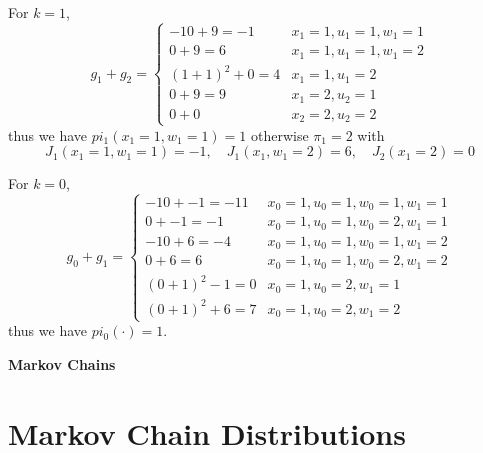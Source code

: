 \documentclass[]{article}
\begin{document}
For $k=1$, \[
    g_1 + g_2= \begin{cases}
        -10 + 9 = -1 &x_1=1, u_1 = 1, w_1 = 1\\
        0 + 9 = 6 &x_1=1, u_1 = 1, w_1 = 2\\
        (1+1)^2 + 0 = 4 &x_1 = 1, u_1 = 2\\
        0 + 9 = 9 &x_1 = 2, u_2 = 1\\
        0 + 0 &x_2 =2, u_2 = 2
    \end{cases}
\] thus we have $pi_1(x_1=1,w_1=1) = 1$ otherwise $\pi_1 = 2$ with \[
    J_1(x_1 = 1, w_1 = 1) = -1, \quad J_1(x_1, w_1=2) = 6, \quad J_2(x_1 = 2) = 0
\]

For $k=0$, \[
    g_0 + g_1 = \begin{cases}
        -10 + -1 = -11 &x_0=1, u_0 = 1, w_0 = 1, w_1 = 1\\
        0 + -1 = -1 &x_0=1, u_0 = 1, w_0 = 2, w_1 = 1\\
        -10 + 6 = -4 &x_0=1, u_0 = 1, w_0 = 1, w_1 = 2\\
        0 + 6 = 6 &x_0=1, u_0 = 1, w_0 = 2, w_1 = 2\\
        (0+1)^2 -1 = 0 &x_0=1, u_0 = 2, w_1 = 1\\
        (0+1)^2 + 6 = 7 &x_0=1, u_0 = 2, w_1 = 2
    \end{cases}
\] thus we have $pi_0(\cdot) = 1$.


\newpage
\textbf{Markov Chains}
\section{Markov Chain Distributions}








% 
% 
\end{document}
